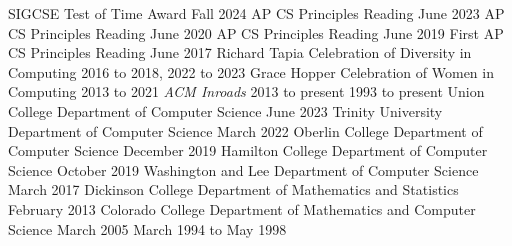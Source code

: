 
\begin{cventries}

    {SIGCSE Test of Time Award}
    {Fall 2024}
    {AP CS Principles Reading}
    {June 2023}
    {AP CS Principles Reading}
    {June 2020}
    {AP CS Principles Reading}
    {June 2019}
    {First AP CS Principles Reading}
    {June 2017}
    {Richard Tapia Celebration of Diversity in Computing}
    {2016 to 2018, 2022 to 2023}
    {Grace Hopper Celebration of Women in Computing}
    {2013 to 2021}
    {\textsl{ACM Inroads}}
    {2013 to present}
    {}
    {1993 to present}
    {Union College Department of Computer Science}
    {June 2023}
    {Trinity University Department of Computer Science}
    {March 2022}
    {Oberlin College Department of Computer Science}
    {December 2019}
    {Hamilton College Department of Computer Science}
    {October 2019}
    {Washington and Lee Department of Computer Science}
    {March 2017}
    {Dickinson College Department of Mathematics and Statistics}
    {February 2013}
    {Colorado College Department of Mathematics and Computer Science}
    {March 2005}
    {}
    {March 1994 to May 1998}

\end{cventries}

